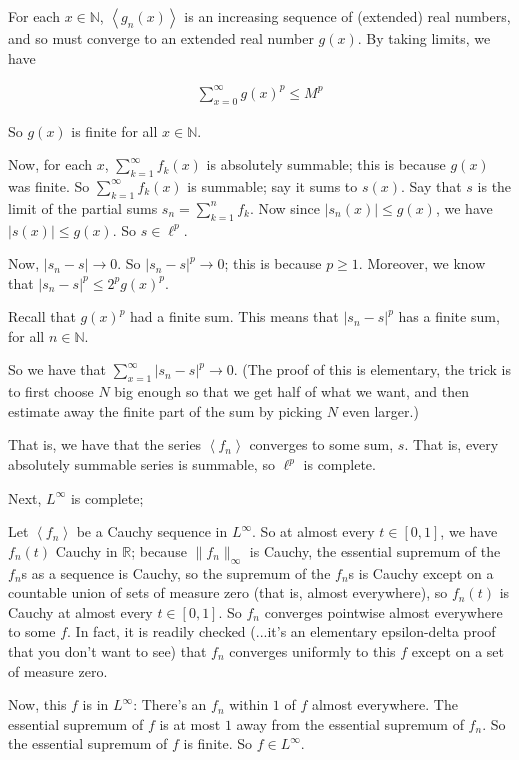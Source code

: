 \documentclass[a4paper,12pt]{article}
\newcommand{\tab}{\hspace{4mm}} %
\newcommand{\absval}[1]{\left\lvert #1 \right\rvert}
\newcommand{\norm}[1]{\|#1\|}
\newcommand{\anbrack}[1]{\left\langle #1 \right\rangle}
\newcommand{\N}{\mathbb{N}}
\newcommand{\R}{\mathbb{R}}
\begin{document}
For each $x \in \N$, $\anbrack{g_n(x)}$ is an increasing sequence of (extended) real numbers, and so must converge to an extended real number $g(x)$. By taking limits, we have

\begin{align*}
\sum\limits_{x=0}^\infty g(x)^p \leq M^p
\end{align*}

So $g(x)$ is finite for all $x \in \N$.

Now, for each $x$, $\sum\limits_{k=1}^\infty f_k(x)$ is absolutely summable; this is because $g(x)$ was finite. So $\sum\limits_{k=1}^\infty f_k(x)$ is summable; say it sums to $s(x)$. Say that $s$ is the limit of the partial sums $s_n = \sum\limits_{k=1}^n f_k$. Now since $\absval{s_n(x)} \leq g(x)$, we have $\absval{s(x)} \leq g(x)$. So $s \in \ell^p$.

Now, $\absval{s_n-s} \to 0$. So $\absval{s_n-s}^p \to 0$; this is because $p \geq 1$. Moreover, we know that $\absval{s_n-s}^p \leq 2^pg(x)^p$.

Recall that $g(x)^p$ had a finite sum. This means that $\absval{s_n-s}^p$ has a finite sum, for all $n \in \N$.

So we have that $\sum\limits_{x=1}^\infty \absval{s_n-s}^p \to 0$. (The proof of this is elementary, the trick is to first choose $N$ big enough so that we get half of what we want, and then estimate away the finite part of the sum by picking $N$ even larger.)

That is, we have that the series $\anbrack{f_n}$ converges to some sum, $s$. That is, every absolutely summable series is summable, so $\ell^p$ is complete.

Next, $L^\infty$ is complete;

\tab Let $\anbrack{f_n}$ be a Cauchy sequence in $L^\infty$. So at almost every $t \in [0,1]$, we have $f_n(t)$ Cauchy in $\R$; because $\norm{f_n}_\infty$ is Cauchy, the essential supremum of the $f_n$s as a sequence is Cauchy, so the supremum of the $f_n$s is Cauchy except on a countable union of sets of measure zero (that is, almost everywhere), so $f_n(t)$ is Cauchy at almost every $t \in [0,1]$. So $f_n$ converges pointwise almost everywhere to some $f$. In fact, it is readily checked (...it's an elementary epsilon-delta proof that you don't want to see) that $f_n$ converges uniformly to this $f$ except on a set of measure zero.

\tab Now, this $f$ is in $L^\infty$: There's an $f_n$ within $1$ of $f$ almost everywhere. The essential supremum of $f$ is at most $1$ away from the essential supremum of $f_n$. So the essential supremum of $f$ is finite. So $f \in L^\infty$.
\end{document}
